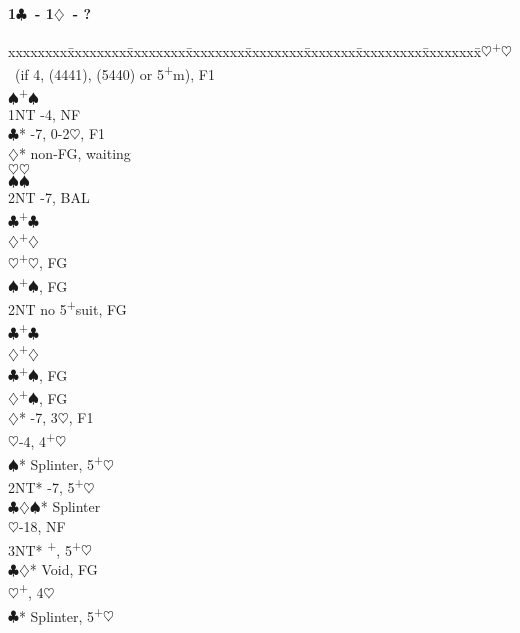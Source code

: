 \documentclass[10pt]{article}
\renewcommand{\c}{$\clubsuit$}
\renewcommand{\d}{$\diamondsuit$}
\newcommand{\h}{$\heartsuit$}
\newcommand{\s}{$\spadesuit$}
\newcommand{\p}{\textsuperscript{+}}
\newenvironment{bidtable}[1][]
{\textbf{#1}
  \begin{adjustwidth}{1em}{}
    \addvspace{2pt}
    \begin{tabbing}
      xxxxxxxx\=xxxxxxxx\=xxxxxxxx\=xxxxxxxx\=xxxxxxxx\=xxxxxxx\=xxxxxxxxx\=xxxxxxxx\=\kill}
{\end{tabbing}\end{adjustwidth}\bigskip}%
\begin{document}
\begin{bidtable}[1\c\ - 1\d\ - ?]
1\h  {}\p\h\ (if 4, (4441), (5440) or 5\p m), F1 \\
     \s  {}\p\s                              \\
     \> 1NT  -4, NF                            \\
     \c* {}-7, 0-2\h, F1                     \\
     \>      \d*     \> non-FG, waiting        \\
     \>      \>          \h {}\h             \\
     \>      \>          \s {}\s             \\
     \>      \>          \> 2NT -7, BAL        \\
     \>      \>          \c {}\p\c           \\
     \>      \>          \d {}\p\d           \\
     \>      \h      {}\p\h, FG              \\
     \>      \s      {}\p\s, FG              \\
     \>      \> 2NT      \> no 5\p suit, FG        \\
     \>      \>          \c {}\p\c           \\
     \>      \>          \d {}\p\d           \\
     \>      \c      {}\p\s, FG              \\
     \>      \d      {}\p\s, FG              \\
     \d* {}-7, 3\h, F1                       \\
     \h  {}-4, 4\p\h                         \\
     \s* \> Splinter, 5\p\h                    \\
     \> 2NT* -7, 5\p\h                         \\
     \>      \c\d\s* \> Splinter               \\
     \>      \h      {}-18, NF              \\
     \>      \> 3NT*     \p, 5\p\h            \\
     \>      \c\d*   \> Void, FG               \\
     \>      \h      {}\p, 4\h              \\
     \c* \> Splinter, 5\p\h                    \\

\end{bidtable}
\end{document}
